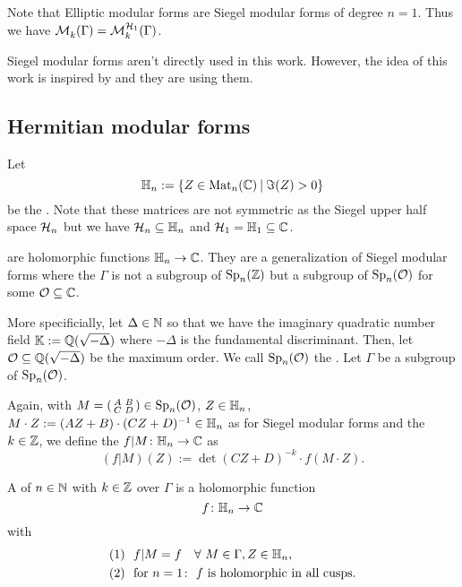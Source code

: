 Note that Elliptic modular forms are Siegel modular forms of degree $n=1$. Thus we have $\operatorname{\mathcal{M}}^{}_k (\Gamma) = \operatorname{\mathcal{M}}^{\mathcal{H}_{1}}_k (\Gamma)$.

Siegel modular forms aren't directly used in this work. However, the idea of this work is inspired by \cite{PoorYuen07Comp} and they are using them.


\subsection{Hermitian modular forms}

Let
\[ \HalfPlane_n :=  \Set{ Z \in \M_n(\C) }{ \Im(Z) > 0} \]
be the . Note that these matrices are not symmetric as the Siegel upper half space $\mathcal{H}_n$ but we have $\mathcal{H}_n \subseteq \mathbb{H}_n$ and $\mathcal{H}_1 = \mathbb{H}_1 \subseteq \mathbb{C}$.

 are holomorphic functions $\mathbb{H}_n \rightarrow \mathbb{C}$. They are a generalization of Siegel modular forms where the  $\Gamma$ is not a subgroup of $\operatorname{Sp}_n(\mathbb{Z})$ but a subgroup of $\operatorname{Sp}_n(\mathcal{O})$ for some $\mathcal{O} \subseteq \mathbb{C}$.


More specificially,
let $\Delta \in \mathbb{N}$ so that we have the imaginary quadratic number field $\mathbb{K} := \mathbb{Q}(\sqrt{-\Delta})$ where $-\Delta$ is the fundamental discriminant.
Then, let $\mathcal{O} \subseteq \mathbb{Q}(\sqrt{-\Delta})$ be the maximum order.
We call $\operatorname{Sp}_n(\mathcal{O})$ the .
Let $\Gamma$ be a subgroup of $\operatorname{Sp}_n(\mathcal{O})$.

Again, with $M = \left( \begin{smallmatrix} A & B \\ C & D \end{smallmatrix} \right) \in \operatorname{Sp}_n(\mathcal{O})$, $Z \in \mathbb{H}_n$, $M \cdot Z := (A Z + B) \cdot (C Z + D)^{-1} \in \mathbb{H}_n$ as for Siegel modular forms and the  $k \in \mathbb{Z}$, we define the  $f | M \colon \mathbb{H}_n \rightarrow \mathbb{C}$ as
\[ (f|M) (Z) := \det(CZ + D)^{-k} \cdot f(M \cdot Z) .\]

A 
of  $n\in\mathbb{N}$
with  $k\in \mathbb{Z}$
over $\Gamma$
is a holomorphic function
\[ f \colon \mathbb{H}_n \rightarrow \mathbb{C} \]
with
\begin{align*}
(1) \ \ & f | M = f \quad\forall\ M \in \Gamma, Z \in \mathbb{H}_n , \\
(2) \ \ & \text{for } n = 1 \colon \ \text{$f$ is holomorphic in all cusps} .
\end{align*}

